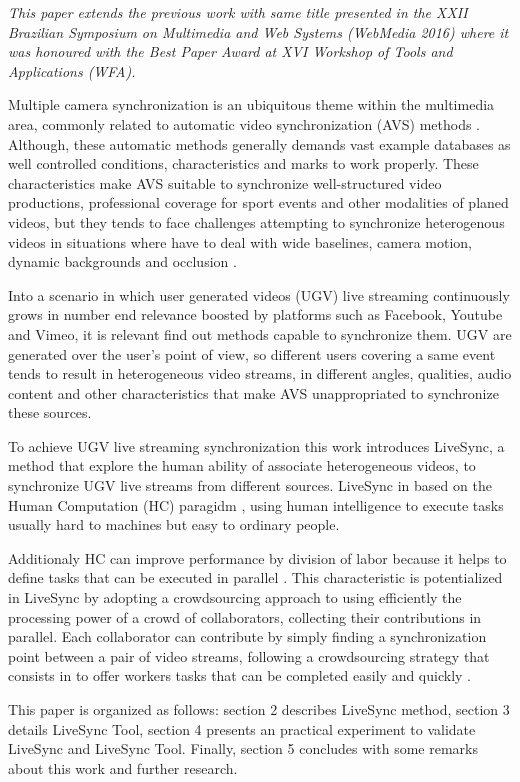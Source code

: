 
\textit{This paper extends the previous work with same title \cite{delivesync} presented in the XXII Brazilian Symposium on Multimedia and Web Systems (WebMedia 2016) where it was honoured with the Best Paper Award at XVI Workshop of Tools and Applications (WFA).}

Multiple camera synchronization is an ubiquitous theme within the multimedia area, commonly related to automatic video synchronization (AVS) methods \cite{wang2014videosnapping}. Although, these automatic methods generally demands vast example databases as well controlled conditions, characteristics and marks to work properly.  These characteristics make AVS suitable to synchronize well-structured video productions, professional coverage for sport events and other modalities of planed videos, but they tends to face challenges attempting to synchronize heterogenous videos in situations where have to deal with wide baselines, camera motion, dynamic backgrounds and occlusion \cite{schweiger2013fully}.

Into a scenario in which user generated videos (UGV) live streaming continuously grows in number end relevance boosted by platforms such as Facebook, Youtube and Vimeo,  it is relevant find out methods capable to synchronize them. UGV are generated over the user's point of view, so different users covering a same event tends to result in heterogeneous video streams, in different angles, qualities, audio content and other characteristics that make AVS unappropriated to synchronize these sources.

To achieve UGV live streaming synchronization this work introduces LiveSync, a  method that explore the human ability of associate  heterogeneous videos, to synchronize UGV live streams from different sources. LiveSync in based on the Human Computation (HC) paragidm \cite{VonAhn:2005:HC:1168246}, using human intelligence to execute tasks usually hard to machines but easy to ordinary people. 

Additionaly HC can improve performance by division of labor because it helps to define tasks that can be executed in parallel \cite{Rohwer:2010:NHC:1837885.1837897}. This characteristic is potentialized in LiveSync by adopting a crowdsourcing \cite{howe2006rise} approach to using efficiently the processing power of a crowd of collaborators, collecting their contributions in parallel. Each collaborator can contribute by simply finding a synchronization point between a pair of video streams, following a crowdsourcing strategy that consists in to offer workers tasks that can be completed easily and quickly \cite{Difallah:2015:DMC:2736277.2741685}.

This paper is organized as follows: section 2 describes LiveSync method, section 3 details LiveSync Tool, section 4 presents an practical experiment to validate LiveSync and LiveSync Tool. Finally, section 5 concludes with some remarks about this work and further research.   




